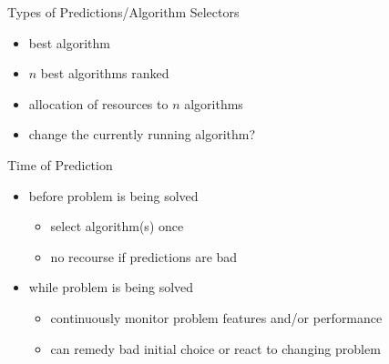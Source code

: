 \begin{frame}{Types of Predictions/Algorithm Selectors}
\begin{itemize}
\item best algorithm
\item $n$ best algorithms ranked
\item allocation of resources to $n$ algorithms
\item change the currently running algorithm?
\end{itemize}
\end{frame}

\begin{frame}{Time of Prediction}
\begin{itemize}
\item before problem is being solved
    \begin{itemize}
    \item select algorithm(s) once
    \item no recourse if predictions are bad
    \end{itemize}
\item while problem is being solved
    \begin{itemize}
    \item continuously monitor problem features and/or performance
    \item can remedy bad initial choice or react to changing problem
    \end{itemize}
\end{itemize}
\end{frame}


